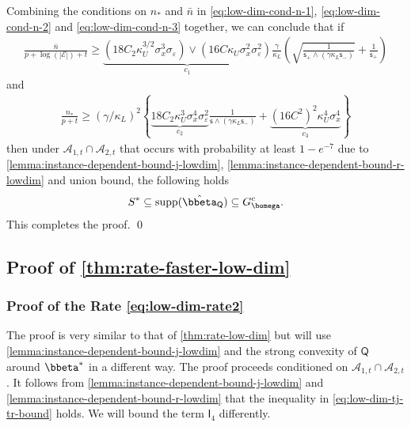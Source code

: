 \documentclass[10pt]{article}
\numberwithin{equation}{section}
\newcommand*{\supp}{\mathrm{supp}}
\begin{document}
Combining the conditions on $n_*$ and $\bar{n}$ in \eqref{eq:low-dim-cond-n-1}, \eqref{eq:low-dim-cond-n-2} and \eqref{eq:low-dim-cond-n-3} together, we can conclude that if
\begin{align}
\label{eq:low-dim-req-n-bar}
    \frac{\bar{n}}{p+\log(|\mathcal{E}|) + t} \ge \underbrace{ (18C_2 \kappa_U^{3/2} \sigma_x^3 \sigma_\varepsilon) \lor (16C\kappa_U \sigma_x^2\sigma_\varepsilon^2)}_{c_1} \frac{\gamma}{\kappa_L} \left( \sqrt{\frac{1}{\mathsf{s}_+ \land (\gamma\kappa_L \mathsf{s}_{-})}} + \frac{1}{\mathsf{s}_+} \right)
\end{align} and
\begin{align}
\label{eq:low-dim-req-n-star}
    \frac{n_*}{p + t} \ge (\gamma/\kappa_L)^2 \left\{\underbrace{18C_2\kappa_U^3 \sigma_x^4 \sigma_\varepsilon^2}_{c_2} \frac{1}{\mathsf{s} \land (\gamma\kappa_L \mathsf{s}_{-})} + \underbrace{(16C^2)^2\kappa_U^4 \sigma_x^4}_{c_3}\right\}
\end{align}
then under $\mathcal{A}_{1,t}\cap \mathcal{A}_{2,t}$ that occurs with probability at least $1-e^{-7}$ due to \cref{lemma:instance-dependent-bound-j-lowdim}, \cref{lemma:instance-dependent-bound-r-lowdim} and union bound, the following holds
\begin{align}
\label{eq:proof-low-dim-variable-selection}
    S^*\subseteq \supp(\hat{\bbeta}_{\mathsf{Q}}) \subseteq G_{\bomega}^c.
\end{align} This completes the proof. \qed



\subsection{Proof of \cref{thm:rate-faster-low-dim}}
\label{sec:proof-thm3}

\subsubsection{Proof of the Rate \eqref{eq:low-dim-rate2}}
The proof is very similar to that of \cref{thm:rate-low-dim} but will use \cref{lemma:instance-dependent-bound-j-lowdim} and the strong convexity of $\mathsf{Q}$ around $\bbeta^*$ in a different way. The proof proceeds conditioned on $\mathcal{A}_{1,t} \cap \mathcal{A}_{2,t}$. It follows from \cref{lemma:instance-dependent-bound-j-lowdim} and \cref{lemma:instance-dependent-bound-r-lowdim} that the inequality in \eqref{eq:low-dim-tj-tr-bound} holds. We will bound the term $\mathsf{I}_4$ differently.
\end{document}
